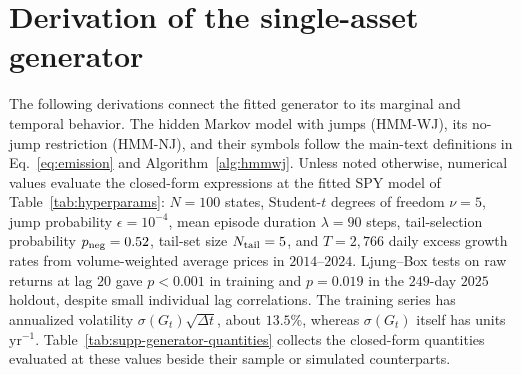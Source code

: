 \section{Derivation of the single-asset generator}
\label{sec:supp-generator}

The following derivations connect the fitted generator to its marginal and temporal behavior. The hidden Markov model with jumps (HMM-WJ), its no-jump
restriction (HMM-NJ), and their symbols follow the main-text
definitions in Eq.~\eqref{eq:emission} and
Algorithm~\ref{alg:hmmwj}. Unless noted otherwise, numerical values
evaluate the closed-form expressions at the fitted SPY model of
Table~\ref{tab:hyperparams}: $N = 100$ states, Student-$t$ degrees of
freedom $\nu = 5$, jump probability $\epsilon = 10^{-4}$, mean episode
duration $\lambda = 90$ steps, tail-selection probability
$p_{\rm neg} = 0.52$, tail-set size $N_{\rm tail} = 5$, and $T = 2{,}766$ daily excess growth rates from volume-weighted average prices in $2014$--$2024$. Ljung--Box tests on raw returns at lag $20$ gave $p<0.001$ in training and $p=0.019$ in the $249$-day $2025$ holdout, despite small individual lag correlations. The training series has annualized volatility $\sigma(G_t)\sqrt{\Delta t}$, about $13.5\%$, whereas $\sigma(G_t)$ itself has units $\mathrm{yr}^{-1}$.
Table~\ref{tab:supp-generator-quantities} collects the closed-form
quantities evaluated at these values beside their sample or simulated
counterparts.

\begin{table}[H]
\centering
\caption{\textbf{Closed-form quantities of the fitted SPY generator
    against sample and simulated values.} Entries evaluate the expressions below at the fitted SPY model of Table~\ref{tab:hyperparams}; jump-path entries use the stated single-episode and finite-horizon approximations. Sample values are computed
    from the in-sample SPY series; simulated values use $400$
    in-sample-length paths for the jump-episode quantities (forced-step
    fraction, jump-path probability, and forced fraction within a jump
    path) and $1{,}000$ paths for skewness. The sup-distance entry is
    the largest gap between the no-jump model's stationary distribution
    function and the in-sample empirical distribution function; for
    comparison, the two-sample Kolmogorov--Smirnov critical value used
    by the path-level tests at $\alpha = 0.05$ for two samples of
    $T = 2{,}766$ observations is $1.358\sqrt{2/T} = 0.0365$. Observed
    autocorrelations are those of the in-sample series shown in
    Fig.~\ref{fig:empirical_motivation}d. Stationary moments describe
    the no-jump mixture unless labeled otherwise. Here $A_t=|G_t|$
    and $\theta_2$ is the transition matrix's second-largest eigenvalue
    in modulus.}
\label{tab:supp-generator-quantities}
\footnotesize
\resizebox{\textwidth}{!}{}
\end{table}

